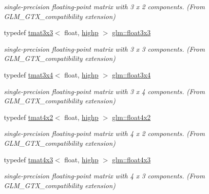 \begin{DoxyCompactItemize}
\begin{DoxyCompactList}\small\item\em single-\/precision floating-\/point matrix with 3 x 2 components. (From G\+L\+M\+\_\+\+G\+T\+X\+\_\+compatibility extension) \end{DoxyCompactList}\item 
typedef \mbox{\hyperlink{structglm_1_1tmat3x3}{tmat3x3}}$<$ float, \mbox{\hyperlink{namespaceglm_a0f04f086094c747d227af4425893f545ac6f7eab42eacbb10d59a58e95e362074}{highp}} $>$ \mbox{\hyperlink{group__gtx__compatibility_ga75c991509a4c4894f10ab480f89e39e7}{glm\+::float3x3}}
\begin{DoxyCompactList}\small\item\em single-\/precision floating-\/point matrix with 3 x 3 components. (From G\+L\+M\+\_\+\+G\+T\+X\+\_\+compatibility extension) \end{DoxyCompactList}\item 
typedef \mbox{\hyperlink{structglm_1_1tmat3x4}{tmat3x4}}$<$ float, \mbox{\hyperlink{namespaceglm_a0f04f086094c747d227af4425893f545ac6f7eab42eacbb10d59a58e95e362074}{highp}} $>$ \mbox{\hyperlink{group__gtx__compatibility_gadbca4a528b4ef17b78afe91c00420087}{glm\+::float3x4}}
\begin{DoxyCompactList}\small\item\em single-\/precision floating-\/point matrix with 3 x 4 components. (From G\+L\+M\+\_\+\+G\+T\+X\+\_\+compatibility extension) \end{DoxyCompactList}\item 
typedef \mbox{\hyperlink{structglm_1_1tmat4x2}{tmat4x2}}$<$ float, \mbox{\hyperlink{namespaceglm_a0f04f086094c747d227af4425893f545ac6f7eab42eacbb10d59a58e95e362074}{highp}} $>$ \mbox{\hyperlink{group__gtx__compatibility_ga4cb477bf8e9167ab065aa70c7767e329}{glm\+::float4x2}}
\begin{DoxyCompactList}\small\item\em single-\/precision floating-\/point matrix with 4 x 2 components. (From G\+L\+M\+\_\+\+G\+T\+X\+\_\+compatibility extension) \end{DoxyCompactList}\item 
typedef \mbox{\hyperlink{structglm_1_1tmat4x3}{tmat4x3}}$<$ float, \mbox{\hyperlink{namespaceglm_a0f04f086094c747d227af4425893f545ac6f7eab42eacbb10d59a58e95e362074}{highp}} $>$ \mbox{\hyperlink{group__gtx__compatibility_gaa0c1ca31e5e064223cc7cfc0344ac787}{glm\+::float4x3}}
\begin{DoxyCompactList}\small\item\em single-\/precision floating-\/point matrix with 4 x 3 components. (From G\+L\+M\+\_\+\+G\+T\+X\+\_\+compatibility extension) \end{DoxyCompactList}\item 

\end{DoxyCompactItemize}
